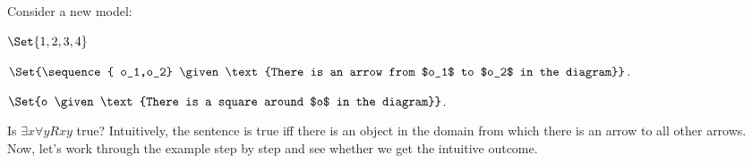 Consider a new model: \begin{center}

 \begin{interp}
\item[\domain] $\Set{1,2,3,4}$
\item[\denote{R}] $\Set{\sequence{ o_1,o_2} \given \text{There is an arrow from $o_1$ to $o_2$ in the diagram}}$.
\item[\denote{S}] $\Set{o \given \text{There is a square around $o$ in the diagram}}$.
\end{interp}
\end{center}

 Is $\exists x\forall y Rxy$ true? Intuitively, the sentence is true iff there is an object in the domain from which there is an arrow to all other arrows. Now, let's work through the example step by step and see whether we get the intuitive outcome.


